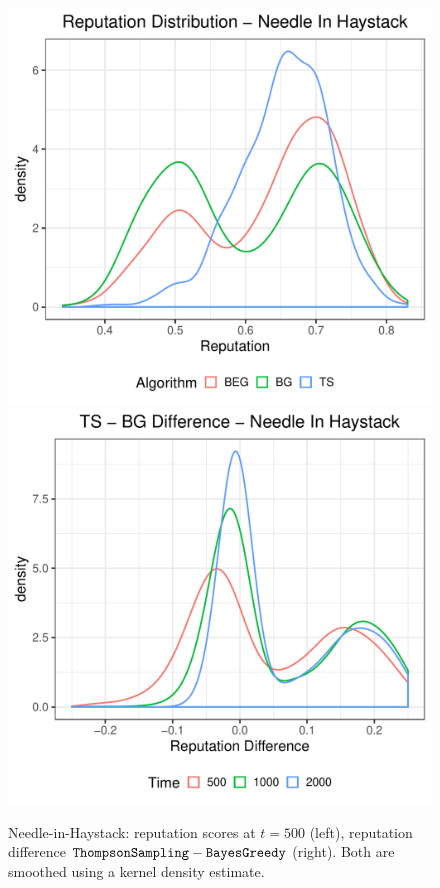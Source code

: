 \documentclass[../competing_bandits_with_appendix.tex]{subfiles}
\begin{document}
\begin{figure}[ht]
\centering
\includegraphics[scale=0.35]{ec19paper/figures/rep_distribution_nih}
\includegraphics[scale=0.35]{ec19paper/figures/ts_dg_rep_diff_nih}
\caption{\footnotesize Needle-in-Haystack: reputation scores at $t=500$ (left), reputation difference $\mathtt{ThompsonSampling} - \mathtt{BayesGreedy}$ (right). Both are smoothed using a kernel density estimate.}
\label{fig:rep_dist_nih}
\end{figure}
\end{document}
